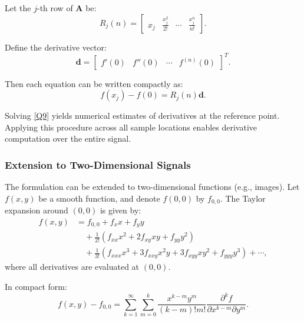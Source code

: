 \documentclass{elsarticle}
\begin{document}
Let the $j$-th row of $\mathbf{A}$ be:
\begin{equation}\label{Q7}
	R_j(n) = \begin{bmatrix}
		x_j & \frac{x_j^2}{2!} & \cdots & \frac{x_j^n}{n!}
	\end{bmatrix}.
\end{equation}

Define the derivative vector:
\begin{equation}
	\mathbf{d} =
	\begin{bmatrix}
		f'(0) & f''(0) & \cdots & f^{(n)}(0)
	\end{bmatrix}^T.
\end{equation}

Then each equation can be written compactly as:
\begin{equation}\label{Q8}
	f(x_j) - f(0) = R_j(n)\mathbf{d}.
\end{equation}

Solving \eqref{Q9} yields numerical estimates of derivatives at the reference point. Applying this procedure across all sample locations enables derivative computation over the entire signal.

\subsubsection{Extension to Two-Dimensional Signals}

The formulation can be extended to two-dimensional functions (e.g., images). Let $f(x,y)$ be a smooth function, and denote $f(0,0)$ by $f_{0,0}$. The Taylor expansion around $(0,0)$ is given by:
\begin{equation}\label{Q10}
	\begin{aligned}
		f(x,y) &= f_{0,0} + f_x x + f_y y \\
		&\quad + \frac{1}{2!} \left( f_{xx} x^2 + 2 f_{xy} xy + f_{yy} y^2 \right) \\
		&\quad + \frac{1}{3!} \left( f_{xxx} x^3 + 3 f_{xxy} x^2 y + 3 f_{xyy} x y^2 + f_{yyy} y^3 \right) + \cdots,
	\end{aligned}
\end{equation}
where all derivatives are evaluated at $(0,0)$.

In compact form:
\begin{equation}\label{Q11}
	f(x,y) - f_{0,0} =
	\sum_{k=1}^{\infty} \sum_{m=0}^{k}
	\frac{x^{k-m} y^{m}}{(k-m)!m!}
	\frac{\partial^{k} f}{\partial x^{k-m} \partial y^{m}}.
\end{equation}
\end{document}
